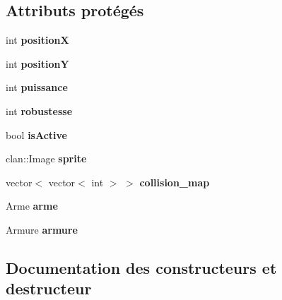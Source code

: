\subsection*{Attributs protégés}
\begin{DoxyCompactItemize}
\item 
\hypertarget{classPersonnage_af599fcbd1767fbf8ef5d1c90a8eaa638}{}int {\bfseries position\+X}\label{classPersonnage_af599fcbd1767fbf8ef5d1c90a8eaa638}

\item 
\hypertarget{classPersonnage_a02842b34a8c93f54772242e40e4c5a8a}{}int {\bfseries position\+Y}\label{classPersonnage_a02842b34a8c93f54772242e40e4c5a8a}

\item 
\hypertarget{classPersonnage_ac53717e24a91a7698955d506c092d2b7}{}int {\bfseries puissance}\label{classPersonnage_ac53717e24a91a7698955d506c092d2b7}

\item 
\hypertarget{classPersonnage_ab3287f35ae3106f42eb195cc60371dae}{}int {\bfseries robustesse}\label{classPersonnage_ab3287f35ae3106f42eb195cc60371dae}

\item 
\hypertarget{classPersonnage_aa724215ef4023e5444f7cdf6a6a3a8f4}{}bool {\bfseries is\+Active}\label{classPersonnage_aa724215ef4023e5444f7cdf6a6a3a8f4}

\item 
\hypertarget{classPersonnage_adf517de2c6d5f39fde55136bf8a031ea}{}clan\+::\+Image {\bfseries sprite}\label{classPersonnage_adf517de2c6d5f39fde55136bf8a031ea}

\item 
\hypertarget{classPersonnage_a5ab0e54e773a08c5efb042dfcbab9251}{}vector$<$ vector$<$ int $>$ $>$ {\bfseries collision\+\_\+map}\label{classPersonnage_a5ab0e54e773a08c5efb042dfcbab9251}

\item 
\hypertarget{classPersonnage_a538199d18a1705e6511c5f17013efd16}{}Arme {\bfseries arme}\label{classPersonnage_a538199d18a1705e6511c5f17013efd16}

\item 
\hypertarget{classPersonnage_a0b1b3eaed5cd4f3721b22645db7833de}{}Armure {\bfseries armure}\label{classPersonnage_a0b1b3eaed5cd4f3721b22645db7833de}

\end{DoxyCompactItemize}


\subsection{Documentation des constructeurs et destructeur}
\hypertarget{classPersonnage_abec36eb0310adc71f3375297fc590c65}{}
